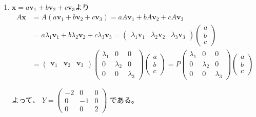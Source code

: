\documentclass[12pt,b5paper]{ltjsarticle}
\begin{document}
\begin{description}
\begin{enumerate}
        \item
             $\bm{x}=a\bm{v}_{1}+b\bm{v}_{2}+c\bm{v}_{3}$より
             \begin{align}
              A\bm{x}
               &=A(a\bm{v}_{1}+b\bm{v}_{2}+c\bm{v}_{3})
               =aA\bm{v}_{1}+bA\bm{v}_{2}+cA\bm{v}_{3}\\
               &=a\lambda_{1}\bm{v}_{1}+b\lambda_{2}\bm{v}_{2}+c\lambda_{3}\bm{v}_{3}
              =
              \begin{pmatrix}
               \lambda_{1}\bm{v}_{1} & \lambda_{2}\bm{v}_{2} & \lambda_{3}\bm{v}_{3}
              \end{pmatrix}
              \begin{pmatrix}
               a \\ b \\ c
              \end{pmatrix}\\
              &=
              \begin{pmatrix}
               \bm{v}_{1} & \bm{v}_{2} & \bm{v}_{3}
              \end{pmatrix}
              \begin{pmatrix}
               \lambda_{1} & 0 & 0 \\
               0 & \lambda_{2} & 0 \\
               0 & 0 & \lambda_{3}
              \end{pmatrix}
              \begin{pmatrix}
               a \\ b \\ c
              \end{pmatrix}
              =
              P
              \begin{pmatrix}
               \lambda_{1} & 0 & 0 \\
               0 & \lambda_{2} & 0 \\
               0 & 0 & \lambda_{3}
              \end{pmatrix}
              \begin{pmatrix}
               a \\ b \\ c
              \end{pmatrix}
             \end{align}

             よって、
             $Y=
             \begin{pmatrix}
               -2 & 0 & 0 \\
               0 & -1 & 0 \\
               0 & 0 & 2
             \end{pmatrix}$
             である。



\end{enumerate}
\end{description}
\end{document}
